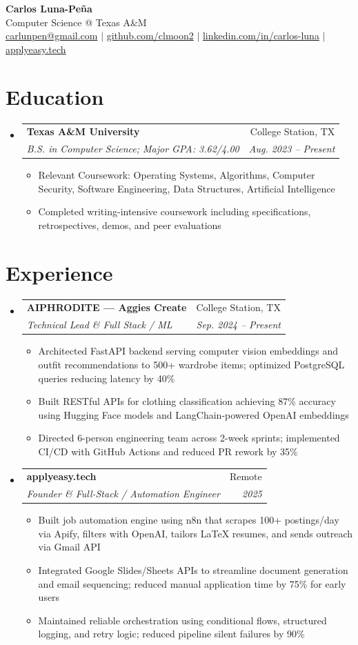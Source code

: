 \documentclass[letterpaper,11pt]{article}
\makeatletter
\newcommand{\resumeItem}[1]{
  \item\small{{#1 \vspace{-2pt}}}
}
\newcommand{\resumeSubheading}[4]{
  \vspace{-2pt}\item
    \begin{tabular*}{0.97\textwidth}[t]{l@{\extracolsep{\fill}}r}
      \textbf{#1} & #2 \\
      \textit{\small#3} & \textit{\small #4} \\
    \end{tabular*}\vspace{-7pt}
}
\newcommand{\resumeSubHeadingListStart}{\begin{itemize}[leftmargin=0.15in, label={}]}
\newcommand{\resumeSubHeadingListEnd}{\end{itemize}}
\newcommand{\resumeItemListStart}{\begin{itemize}}
\newcommand{\resumeItemListEnd}{\end{itemize}\vspace{-5pt}}
\makeatother
\begin{document}
\begin{center}
  \textbf{\Huge Carlos Luna-Pe\~na} \\
  \small Computer Science @ Texas A\&M \\
  \href{mailto:carlunpen@gmail.com}{carlunpen@gmail.com} $|$ \href{https://github.com/clmoon2}{github.com/clmoon2} $|$ \href{https://linkedin.com/in/carlos-luna}{linkedin.com/in/carlos-luna} $|$ \href{https://applyeasy.tech}{applyeasy.tech}
\end{center}

\section{Education}
\resumeSubHeadingListStart
\resumeSubheading
  {Texas A\&M University}{College Station, TX}
  {B.S. in Computer Science; Major GPA: 3.62/4.00}{Aug. 2023 -- Present}
  \resumeItemListStart
    \resumeItem{Relevant Coursework: Operating Systems, Algorithms, Computer Security, Software Engineering, Data Structures, Artificial Intelligence}
    \resumeItem{Completed writing-intensive coursework including specifications, retrospectives, demos, and peer evaluations}
  \resumeItemListEnd
\resumeSubHeadingListEnd

\section{Experience}
\resumeSubHeadingListStart
\resumeSubheading
  {AIPHRODITE — Aggies Create}{College Station, TX}
  {Technical Lead \& Full Stack / ML}{Sep. 2024 -- Present}
  \resumeItemListStart
    \resumeItem{Architected FastAPI backend serving computer vision embeddings and outfit recommendations to 500+ wardrobe items; optimized PostgreSQL queries reducing latency by 40\%}
    \resumeItem{Built RESTful APIs for clothing classification achieving 87\% accuracy using Hugging Face models and LangChain-powered OpenAI embeddings}
    \resumeItem{Directed 6-person engineering team across 2-week sprints; implemented CI/CD with GitHub Actions and reduced PR rework by 35\%}
  \resumeItemListEnd

\resumeSubheading
  {applyeasy.tech}{Remote}
  {Founder \& Full-Stack / Automation Engineer}{2025}
  \resumeItemListStart
    \resumeItem{Built job automation engine using n8n that scrapes 100+ postings/day via Apify, filters with OpenAI, tailors LaTeX resumes, and sends outreach via Gmail API}
    \resumeItem{Integrated Google Slides/Sheets APIs to streamline document generation and email sequencing; reduced manual application time by 75\% for early users}
    \resumeItem{Maintained reliable orchestration using conditional flows, structured logging, and retry logic; reduced pipeline silent failures by 90\%}
  \resumeItemListEnd
\resumeSubHeadingListEnd
\end{document}
